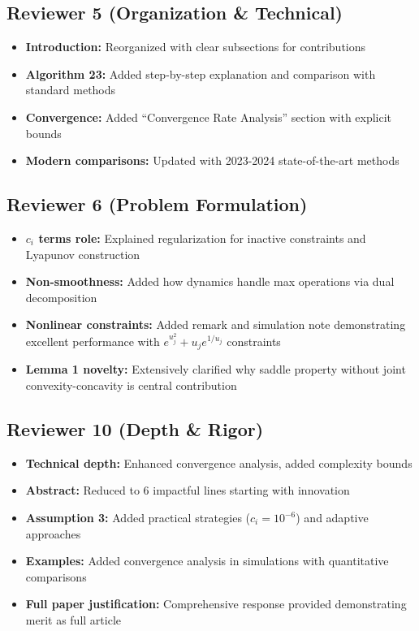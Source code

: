 \documentclass[11pt]{article}
\begin{document}
\subsection{Reviewer 5 (Organization \& Technical)}
\begin{itemize}[topsep=0pt,itemsep=2pt]
\item \textbf{Introduction:} Reorganized with clear subsections for contributions
\item \textbf{Algorithm 23:} Added step-by-step explanation and comparison with standard methods
\item \textbf{Convergence:} Added ``Convergence Rate Analysis'' section with explicit bounds
\item \textbf{Modern comparisons:} Updated with 2023-2024 state-of-the-art methods
\end{itemize}

\subsection{Reviewer 6 (Problem Formulation)}
\begin{itemize}[topsep=0pt,itemsep=2pt]
\item \textbf{$c_i$ terms role:} Explained regularization for inactive constraints and Lyapunov construction
\item \textbf{Non-smoothness:} Added how dynamics handle max operations via dual decomposition
\item \textbf{Nonlinear constraints:} Added remark and simulation note demonstrating excellent performance with $e^{u_j^2}+u_j e^{1/u_j}$ constraints
\item \textbf{Lemma 1 novelty:} Extensively clarified why saddle property without joint convexity-concavity is central contribution
\end{itemize}

\subsection{Reviewer 10 (Depth \& Rigor)}
\begin{itemize}[topsep=0pt,itemsep=2pt]
\item \textbf{Technical depth:} Enhanced convergence analysis, added complexity bounds
\item \textbf{Abstract:} Reduced to 6 impactful lines starting with innovation
\item \textbf{Assumption 3:} Added practical strategies ($c_i = 10^{-6}$) and adaptive approaches
\item \textbf{Examples:} Added convergence analysis in simulations with quantitative comparisons
\item \textbf{Full paper justification:} Comprehensive response provided demonstrating merit as full article
\end{itemize}
\end{document}
